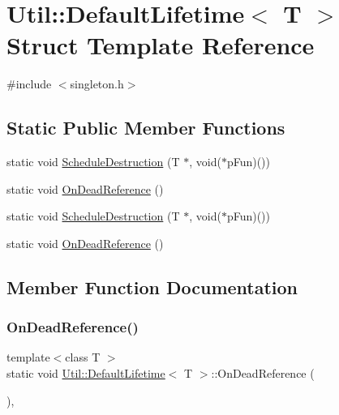 \hypertarget{structUtil_1_1DefaultLifetime}{}\section{Util\+:\+:Default\+Lifetime$<$ T $>$ Struct Template Reference}
\label{structUtil_1_1DefaultLifetime}


{\ttfamily \#include $<$singleton.\+h$>$}

\subsection*{Static Public Member Functions}
\begin{DoxyCompactItemize}
\item 
static void \mbox{\hyperlink{structUtil_1_1DefaultLifetime_a2a646e6fc88719ca87092383c223850b}{Schedule\+Destruction}} (T $\ast$, void($\ast$p\+Fun)())
\item 
static void \mbox{\hyperlink{structUtil_1_1DefaultLifetime_a166e155ff3682f6482e3cd6e502d2d83}{On\+Dead\+Reference}} ()
\item 
static void \mbox{\hyperlink{structUtil_1_1DefaultLifetime_a2a646e6fc88719ca87092383c223850b}{Schedule\+Destruction}} (T $\ast$, void($\ast$p\+Fun)())
\item 
static void \mbox{\hyperlink{structUtil_1_1DefaultLifetime_a166e155ff3682f6482e3cd6e502d2d83}{On\+Dead\+Reference}} ()
\end{DoxyCompactItemize}


\subsection{Member Function Documentation}
\mbox{\label{structUtil_1_1DefaultLifetime_a166e155ff3682f6482e3cd6e502d2d83}} 
\subsubsection{\texorpdfstring{OnDeadReference()}{OnDeadReference()}\hspace{0.1cm}{\footnotesize\ttfamily [1/2]}}
{\footnotesize\ttfamily template$<$class T $>$ \\
static void \mbox{\hyperlink{structUtil_1_1DefaultLifetime}{Util\+::\+Default\+Lifetime}}$<$ T $>$\+::On\+Dead\+Reference (\begin{DoxyParamCaption}{ }\end{DoxyParamCaption})\hspace{0.3cm}{\ttfamily [inline]}, {\ttfamily [static]}}

